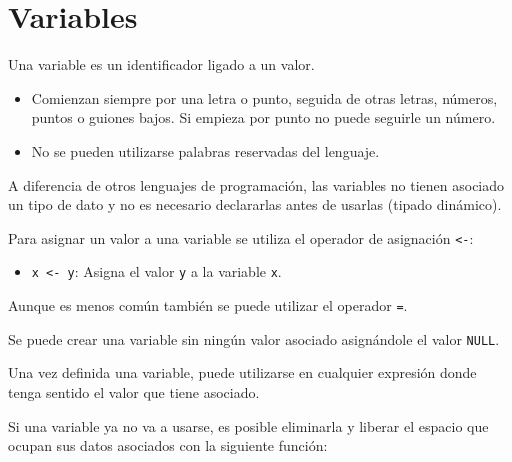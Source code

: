 \documentclass[
  a4paper,
]{scrreport}
\providecommand{\tightlist}{%
  \setlength{\itemsep}{0pt}\setlength{\parskip}{0pt}}\usepackage{longtable,booktabs,array}
\theoremstyle{definition}
\theoremstyle{definition}
\theoremstyle{remark}
\begin{document}
\hypertarget{variables}{%
\section{Variables}\label{variables}}

Una variable es un identificador ligado a un valor.

\begin{tcolorbox}[enhanced jigsaw, colbacktitle=quarto-callout-note-color!10!white, breakable, opacitybacktitle=0.6, left=2mm, opacityback=0, leftrule=.75mm, colframe=quarto-callout-note-color-frame, bottomrule=.15mm, toprule=.15mm, toptitle=1mm, colback=white, titlerule=0mm, title=\textcolor{quarto-callout-note-color}{\faInfo}\hspace{0.5em}{Reglas para nombrar variables}, rightrule=.15mm, arc=.35mm, bottomtitle=1mm, coltitle=black]

\begin{itemize}
\tightlist
\item
  Comienzan siempre por una letra o punto, seguida de otras letras,
  números, puntos o guiones bajos. Si empieza por punto no puede
  seguirle un número.
\item
  No se pueden utilizarse palabras reservadas del lenguaje.
\end{itemize}

\end{tcolorbox}

A diferencia de otros lenguajes de programación, las variables no tienen
asociado un tipo de dato y no es necesario declararlas antes de usarlas
(tipado dinámico).

Para asignar un valor a una variable se utiliza el operador de
asignación \texttt{\textless{}-}:

\begin{itemize}
\tightlist
\item
  \texttt{x\ \textless{}-\ y}: Asigna el valor \texttt{y} a la variable
  \texttt{x}.
\end{itemize}

Aunque es menos común también se puede utilizar el operador \texttt{=}.

Se puede crear una variable sin ningún valor asociado asignándole el
valor \texttt{NULL}.

Una vez definida una variable, puede utilizarse en cualquier expresión
donde tenga sentido el valor que tiene asociado.

Si una variable ya no va a usarse, es posible eliminarla y liberar el
espacio que ocupan sus datos asociados con la siguiente función:
\end{document}
